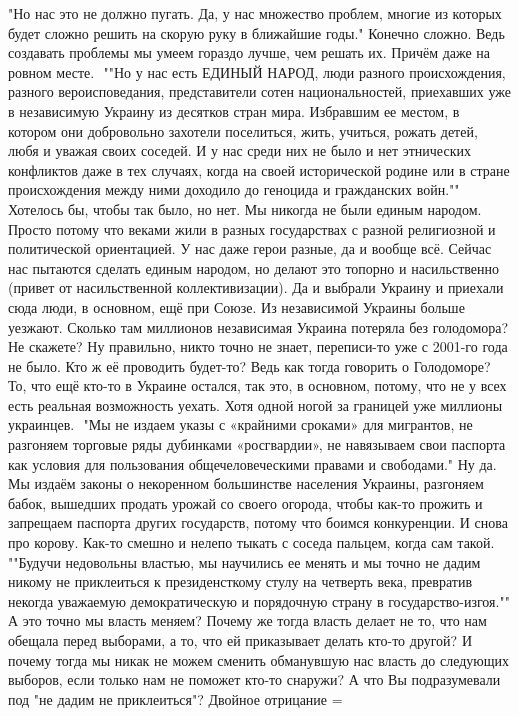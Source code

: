 \begin{itemize}
"Но нас это не должно пугать. Да, у нас множество проблем, многие из которых
будет сложно решить на скорую руку в ближайшие годы."
Конечно сложно. Ведь создавать проблемы мы умеем гораздо лучше, чем решать их. Причём даже на ровном месте.
⁠
""Но у нас есть ЕДИНЫЙ НАРОД, люди разного происхождения, разного
вероисповедания, представители сотен национальностей, приехавших уже в
независимую Украину из десятков стран мира. Избравшим ее местом, в котором они
добровольно захотели поселиться, жить, учиться, рожать детей, любя и уважая
своих соседей. И у нас среди них не было и нет этнических конфликтов даже в тех
случаях, когда на своей исторической родине или в стране происхождения между
ними доходило до геноцида и гражданских войн.""
Хотелось бы, чтобы так было, но нет. Мы никогда не были единым народом. Просто
потому что веками жили в разных государствах с разной религиозной и
политической ориентацией. У нас даже герои разные, да и вообще всё. Сейчас нас
пытаются сделать единым народом, но делают это топорно и насильственно (привет
от насильственной коллективизации). Да и выбрали Украину и приехали сюда люди,
в основном, ещё при Союзе. Из независимой Украины больше уезжают. Сколько там
миллионов независимая Украина потеряла без голодомора? Не скажете? Ну
правильно, никто точно не знает, переписи-то уже с 2001-го года не было. Кто ж
её проводить будет-то? Ведь как тогда говорить о Голодоморе? То, что ещё кто-то
в Украине остался, так это, в основном, потому, что не у всех есть реальная
возможность уехать. Хотя одной ногой за границей уже миллионы украинцев.
⁠
"Мы не издаем указы с «крайними сроками» для мигрантов, не разгоняем торговые
ряды дубинками «росгвардии», не навязываем свои паспорта как условия для
пользования общечеловеческими правами и свободами."
Ну да. Мы издаём законы о некоренном большинстве населения Украины, разгоняем
бабок, вышедших продать урожай со своего огорода, чтобы как-то прожить и
запрещаем паспорта других государств, потому что боимся конкуренции. И снова
про корову. Как-то смешно и нелепо тыкать с соседа пальцем, когда сам такой.  ⁠
⁠
""Будучи недовольны властью, мы научились ее менять и мы точно не дадим никому
не приклеиться к президенсткому стулу на четверть века, превратив некогда
уважаемую демократическую и порядочную страну в государство-изгоя.""
А это точно мы власть меняем? Почему же тогда власть делает не то, что нам
обещала перед выборами, а то, что ей приказывает делать кто-то другой? И почему
тогда мы никак не можем сменить обманувшую нас власть до следующих выборов,
если только нам не поможет кто-то снаружи?
А что Вы подразумевали под "не дадим не приклеиться"? Двойное отрицание =

\end{itemize}
